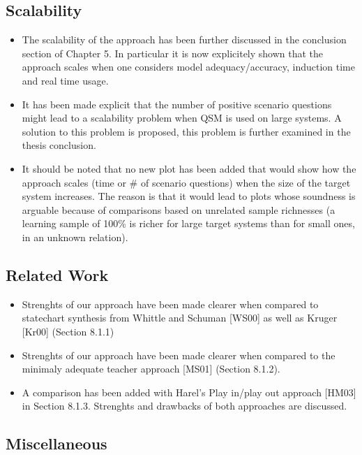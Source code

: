 \subsection*{Scalability}

\begin{itemize}
\item The scalability of the approach has been further discussed in the conclusion
    section of Chapter 5. In particular it is now explicitely shown that the 
    approach scales when one considers model adequacy/accuracy, induction time 
    and real time usage. 
\item It has been made explicit that the number of positive scenario questions 
    might lead to a scalability problem when QSM is used on large systems.
    A solution to this problem is proposed, this problem is further examined in
    the thesis conclusion.
\item It should be noted that no new plot has been added that would show how the 
    approach scales (time or \# of scenario questions) when the size of the 
    target system increases. The reason is that it would lead to plots whose 
    soundness is arguable because of comparisons based on unrelated sample 
    richnesses (a learning sample of 100\% is richer for large target systems 
    than for small ones, in an unknown relation).
\end{itemize}

\subsection*{Related Work}

\begin{itemize}
\item Strenghts of our approach have been made clearer when compared to statechart 
  synthesis from Whittle and Schuman [WS00] as well as Kruger [Kr00] (Section 
  8.1.1)
\item Strenghts of our approach have been made clearer when compared to the minimaly
  adequate teacher approach [MS01] (Section 8.1.2).
\item A comparison has been added with Harel's Play in/play out approach [HM03] in
  Section 8.1.3. Strenghts and drawbacks of both approaches are discussed.
\end{itemize}

\subsection*{Miscellaneous}

